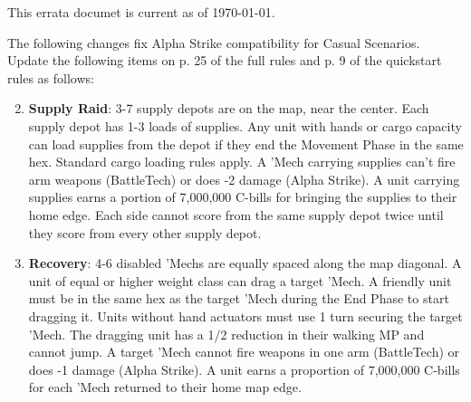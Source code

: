 This errata documet is current as of \today{}.

The following changes fix Alpha Strike compatibility for Casual Scenarios.
Update the following items on p. 25 of the full rules and p. 9 of the quickstart rules  as follows:

\begin{enumerate}

\setcounter{enumi}{1}
\item {\bfseries Supply Raid}: 3-7 supply depots are on the map, near the center.
Each supply depot has 1-3 loads of supplies.
Any unit with hands or cargo capacity can load supplies from the depot if they end the Movement Phase in the same hex.
Standard cargo loading rules apply.
A 'Mech carrying supplies can't fire arm weapons (BattleTech) or does -2 damage (Alpha Strike).
A unit carrying supplies earns a portion of 7,000,000 C-bills for bringing the supplies to their home edge.
Each side cannot score from the same supply depot twice until they score from every other supply depot.

\setcounter{enumi}{7}
\item {\bfseries Recovery}: 4-6 disabled 'Mechs are equally spaced along the map diagonal.
A unit of equal or higher weight class can drag a target 'Mech.
A friendly unit must be in the same hex as the target 'Mech during the End Phase to start dragging it.
Units without hand actuators must use 1 turn securing the target 'Mech.
The dragging unit has a 1/2 reduction in their walking MP and cannot jump.
A target 'Mech cannot fire weapons in one arm (BattleTech) or does -1 damage (Alpha Strike).
A unit earns a proportion of 7,000,000 C-bills for each 'Mech returned to their home map edge.

\end{enumerate}
